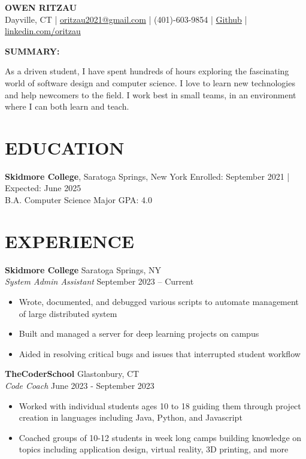 \documentclass[a4paper,9pt]{extarticle}
\begin{document}
\pagestyle{empty}

\begin{center}
\textbf{\Large OWEN RITZAU}\\[2pt] %
Dayville, CT | 
\href{mailto:oritzau2021@gmail.com}{oritzau2021@gmail.com} | 
(401)-603-9854 | 
\href{https://github.com/oritzau}{Github} |
\href{https://www.linkedin.com/in/owen-ritzau-169595239}{linkedin.com/oritzau}

\textbf{SUMMARY:}

As a driven student, I have spent hundreds of hours exploring the fascinating world of software design and computer science. I love to learn new technologies and help newcomers to the field. I work best in small teams, in an environment where I can both learn and teach.
\end{center}

\section*{EDUCATION}
\noindent
\textbf{Skidmore College}, Saratoga Springs, New York 
\hfill Enrolled: September 2021 | Expected: June 2025\\ 
B.A. Computer Science \hfill Major GPA: 4.0 %

\section*{EXPERIENCE}
\noindent
\textbf{Skidmore College} \hfill Saratoga Springs, NY \\ %
\textit{System Admin Assistant} \hfill September 2023 – Current %
\begin{itemize}
    \item Wrote, documented, and debugged various scripts to automate 
        management of large distributed system
	\item Built and managed a server for deep learning projects on campus
	\item Aided in resolving critical bugs and issues that interrupted 
		student workflow
\end{itemize}

\noindent
\textbf{TheCoderSchool} \hfill Glastonbury, CT \\ %
\textit{Code Coach} \hfill June 2023 - September 2023 %
\begin{itemize}
    \item Worked with individual students ages 10 to 18 guiding them through
        project creation in languages including Java, Python, and Javascript
    \item Coached groups of 10-12 students in week long camps building 
        knowledge on topics including application design, virtual reality,
        3D printing, and more
\end{itemize}
\end{document}
